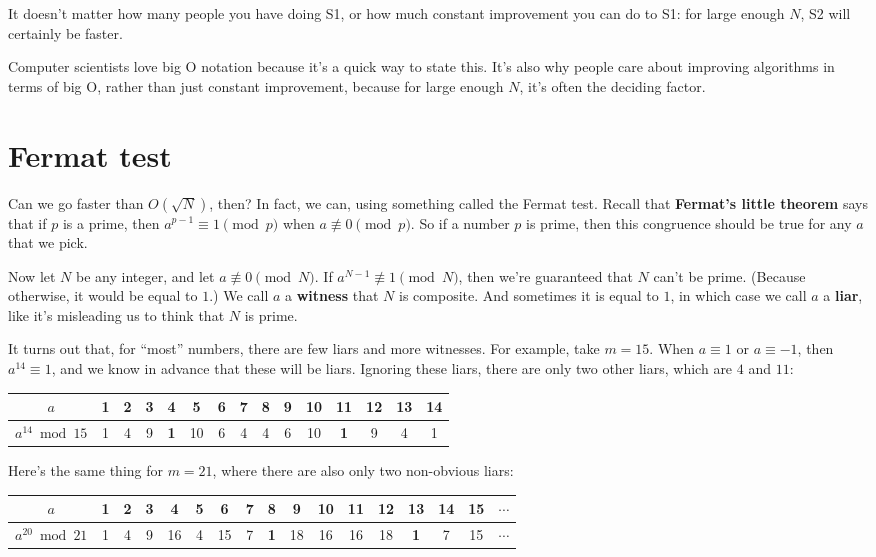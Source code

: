 \documentclass[11pt,paper=letter]{scrartcl}
\begin{document}
It doesn't matter how many people you have doing S1, or how much constant improvement you can do to S1: for large enough $N$, S2 will certainly be faster.

Computer scientists love big O notation because it's a quick way to state this. It's also why people care about improving algorithms in terms of big O, rather than just constant improvement, because for large enough $N$, it's often the deciding factor.

\section{Fermat test}

Can we go faster than $O(\sqrt{N})$, then? In fact, we can, using something called the Fermat test. Recall that \textbf{Fermat's little theorem} says that if $p$ is a prime, then $a^{p-1} \equiv 1 \pmod p$ when $a \not\equiv 0 \pmod p$. So if a number $p$ is prime, then this congruence should be true for any $a$ that we pick.

Now let $N$ be any integer, and let $a \not\equiv 0 \pmod N$. If $a^{N-1} \not\equiv 1 \pmod N$, then we're guaranteed that $N$ can't be prime. (Because otherwise, it would be equal to $1$.) We call $a$ a \textbf{witness} that $N$ is composite. And sometimes it is equal to $1$, in which case we call $a$ a \textbf{liar}, like it's misleading us to think that $N$ is prime.

It turns out that, for ``most'' numbers, there are few liars and more witnesses. For example, take $m = 15$. When $a \equiv 1$ or $a \equiv -1$, then $a^{14} \equiv 1$, and we know in advance that these will be liars. Ignoring these liars, there are only two other liars, which are $4$ and $11$:

\begin{center}
  \begin{tabular}{c|cccccccccccccc}
  $a$ & 1 & 2 & 3 & \textbf{4} & 5 & 6 & 7 & 8 & 9 & 10 & \textbf{11} & 12 & 13 & 14 \\ \hline
  $a^{14}\bmod 15$ & 1 & 4 & 9 & \textbf{1} & 10 & 6 & 4 & 4 & 6 & 10 & \textbf{1} & 9 & 4 & 1
  \end{tabular}
\end{center}

Here's the same thing for $m = 21$, where there are also only two non-obvious liars:

\begin{center}
  \begin{tabular}{c|cccccccccccccccc}
  $a$ & 1 & 2 & 3 & 4 & 5 & 6 & 7 & \textbf{8} & 9 & 10 & 11 & 12 & \textbf{13} & 14 & 15 & $\cdots$ \\ \hline
  $a^{20}\bmod 21$ & 1 & 4 & 9 & 16 & 4 & 15 & 7 & \textbf{1} & 18 & 16 & 16 & 18 & \textbf{1} & 7 & 15 & $\cdots$
  \end{tabular}
\end{center}
\end{document}
